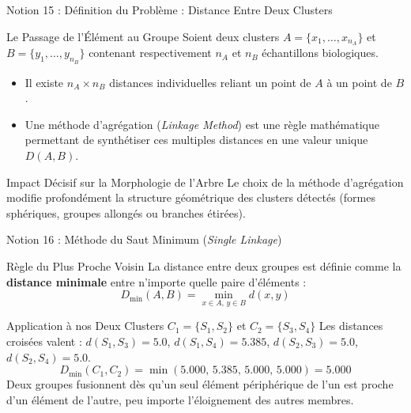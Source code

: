 \documentclass[aspectratio=169,10pt]{beamer}
\begin{document}
\begin{frame}{Notion 15 : Définition du Problème : Distance Entre Deux Clusters}
  \begin{conceptbox}{Le Passage de l'Élément au Groupe}
    \footnotesize
    Soient deux clusters $A = \{x_1, \dots, x_{n_A}\}$ et $B = \{y_1, \dots, y_{n_B}\}$ contenant respectivement $n_A$ et $n_B$ échantillons biologiques.
    \begin{itemize}
      \item Il existe $n_A \times n_B$ distances individuelles reliant un point de $A$ à un point de $B$.
      \item Une méthode d'agrégation (\textit{Linkage Method}) est une règle mathématique permettant de synthétiser ces multiples distances en une valeur unique $D(A, B)$.
    \end{itemize}
  \end{conceptbox}
  \vspace{1mm}
  \begin{takeawaybox}{Impact Décisif sur la Morphologie de l'Arbre}
    \footnotesize
    Le choix de la méthode d'agrégation modifie profondément la structure géométrique des clusters détectés (formes sphériques, groupes allongés ou branches étirées).
  \end{takeawaybox}
\end{frame}

\begin{frame}{Notion 16 : Méthode du Saut Minimum (\textit{Single Linkage})}
  \begin{conceptbox}{Règle du Plus Proche Voisin}
    \footnotesize
    La distance entre deux groupes est définie comme la \textbf{distance minimale} entre n'importe quelle paire d'éléments :
    \begin{equation*}
      D_{\min}(A, B) = \min_{x \in A, \, y \in B} d(x, y)
    \end{equation*}
  \end{conceptbox}
  \vspace{1mm}
  \begin{biobox}{Application à nos Deux Clusters $C_1 = \{S_1, S_2\}$ et $C_2 = \{S_3, S_4\}$}
    \footnotesize
    Les distances croisées valent : $d(S_1, S_3) = 5.0$, $d(S_1, S_4) = 5.385$, $d(S_2, S_3) = 5.0$, $d(S_2, S_4) = 5.0$.
    \begin{equation*}
      D_{\min}(C_1, C_2) = \min(5.000, \, 5.385, \, 5.000, \, 5.000) = \mathbf{5.000}
    \end{equation*}
    Deux groupes fusionnent dès qu'un seul élément périphérique de l'un est proche d'un élément de l'autre, peu importe l'éloignement des autres membres.
  \end{biobox}
\end{frame}
\end{document}
